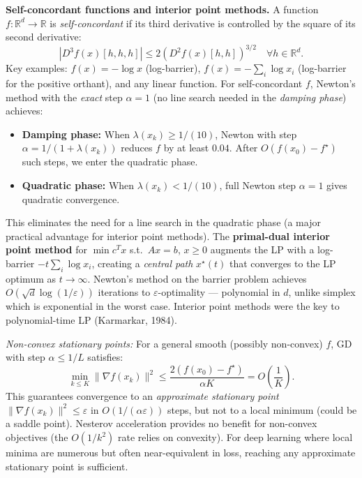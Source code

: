 \documentclass[11pt,a4paper]{article}
\theoremstyle{definition}
\begin{document}
\noindent\textbf{Self-concordant functions and interior point methods.} A function $f: \mathbb{R}^d \to \mathbb{R}$ is \emph{self-concordant} if its third derivative is controlled by the square of its second derivative:
\begin{equation}
|D^3f(x)[h,h,h]| \leq 2(D^2f(x)[h,h])^{3/2} \quad \forall h \in \mathbb{R}^d.
\label{eq:self_concordant}
\end{equation}
Key examples: $f(x) = -\log x$ (log-barrier), $f(x) = -\sum_i \log x_i$ (log-barrier for the positive orthant), and any linear function. For self-concordant $f$, Newton's method with the \emph{exact} step $\alpha = 1$ (no line search needed in the \emph{damping phase}) achieves:
\begin{itemize}
\item \textbf{Damping phase:} When $\lambda(x_k) \geq 1/(10)$, Newton with step $\alpha = 1/(1+\lambda(x_k))$ reduces $f$ by at least $0.04$. After $O(f(x_0) - f^{\star})$ such steps, we enter the quadratic phase.
\item \textbf{Quadratic phase:} When $\lambda(x_k) < 1/(10)$, full Newton step $\alpha = 1$ gives quadratic convergence.
\end{itemize}
This eliminates the need for a line search in the quadratic phase (a major practical advantage for interior point methods). The \textbf{primal-dual interior point method} for $\min c^T x$ s.t.\ $Ax = b$, $x \geq 0$ augments the LP with a log-barrier $-t\sum_i \log x_i$, creating a \emph{central path} $x^{\star}(t)$ that converges to the LP optimum as $t \to \infty$. Newton's method on the barrier problem achieves $O(\sqrt{d}\log(1/\varepsilon))$ iterations to $\varepsilon$-optimality --- polynomial in $d$, unlike simplex which is exponential in the worst case. Interior point methods were the key to polynomial-time LP (Karmarkar, 1984).

\noindent\textit{Non-convex stationary points:} For a general smooth (possibly non-convex) $f$, GD with step $\alpha \leq 1/L$ satisfies:
\begin{equation}
\min_{k \leq K} \|\nabla f(x_k)\|^2 \leq \frac{2(f(x_0) - f^{\star})}{\alpha K} = O\!\left(\frac{1}{K}\right).
\end{equation}
This guarantees convergence to an \emph{approximate stationary point} $\|\nabla f(x_k)\|^2 \leq \varepsilon$ in $O(1/(\alpha\varepsilon))$ steps, but not to a local minimum (could be a saddle point). Nesterov acceleration provides no benefit for non-convex objectives (the $O(1/k^2)$ rate relies on convexity). For deep learning where local minima are numerous but often near-equivalent in loss, reaching any approximate stationary point is sufficient.
\end{document}
